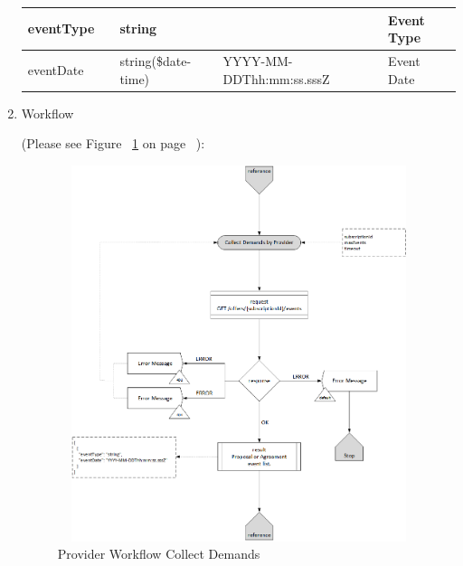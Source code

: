 \begin{enumerate}
\begin{center}
\begin{tabular}{|p{3cm}|l|p{3cm}|p{3cm}|p{4cm}|}
eventType	& 	& 	string	&		&	Event Type \\ 

\hline

eventDate	& 	& 	string(\$date-time)	&	YYYY-MM-DDThh:mm:ss.sssZ	&	Event Date \\ 

\hline

\end{tabular}
\end{center}


\item Workflow

(Please see Figure ~\ref{fig:CD} on page ~\pageref{fig:CD}):

\begin{figure}[htbp]
    \centering
    \includegraphics[width=11cm,height=11cm,angle=0]{./diag/Workflow/Market/CollectDemads-P-Workflow.png}
    \caption{Provider Workflow Collect Demands }
	\label{fig:CD}
\end{figure}


\end{enumerate}

\newpage


